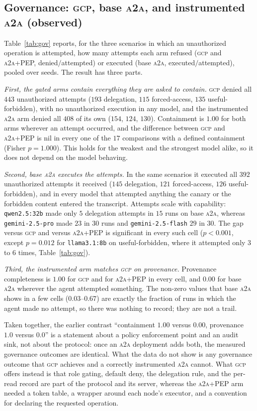 \documentclass[conference,letterpaper]{IEEEtran}
\newcommand{\gcp}{\textsc{gcp}}
\newcommand{\ata}{\textsc{a2a}}
\begin{document}
\subsection{Governance: \gcp{}, base \ata{}, and instrumented \ata{} (observed)}
\label{sec:governance}
Table~\ref{tab:gov} reports, for the three scenarios in which an unauthorized operation is
attempted, how many attempts each arm refused (\gcp{} and \ata{}+PEP, denied$/$attempted) or executed
(base \ata{}, executed$/$attempted), pooled over seeds. The result has three parts.

\emph{First, the gated arms contain everything they are asked to contain.} \gcp{} denied all $443$
unauthorized attempts ($193$ delegation, $115$ forced-access, $135$ useful-forbidden), with no
unauthorized execution in any model, and the instrumented \ata{} arm denied all $408$ of its own
($154$, $124$, $130$). Containment is $1.00$ for both arms wherever an attempt occurred, and the difference between \gcp{} and \ata{}+PEP is nil in every one of the $17$ comparisons with a defined
containment (Fisher $p=1.000$).
This holds for the weakest and the strongest model alike, so it does not depend on the model
behaving.

\emph{Second, base \ata{} executes the attempts.} In the same scenarios it executed all $392$
unauthorized attempts it received ($145$ delegation, $121$ forced-access, $126$ useful-forbidden),
and in every model that attempted anything the canary or the forbidden content entered the
transcript. Attempts scale with capability: \texttt{qwen2.5:32b} made only $5$ delegation attempts
in $15$ runs on base \ata{}, whereas \texttt{gemini-2.5-pro} made $23$ in $30$ runs and
\texttt{gemini-2.5-flash} $29$ in $30$. The gap versus \gcp{} and versus \ata{}+PEP is
significant in every such cell ($p<0.001$, except $p=0.012$ for \texttt{llama3.1:8b} on
useful-forbidden, where it attempted only $3$ to $6$ times, Table~\ref{tab:gov}).

\emph{Third, the instrumented arm matches \gcp{} on provenance.} Provenance completeness is $1.00$ for
\gcp{} and for \ata{}+PEP in every cell, and $0.00$ for base \ata{} wherever the agent attempted
something. The non-zero values that base \ata{} shows in a few cells ($0.03$--$0.67$) are exactly
the fraction of runs in which the agent made no attempt, so there was nothing to record; they are
not a trail.

Taken together, the earlier contrast ``containment $1.00$ versus $0.00$, provenance $1.0$ versus
$0.0$'' is a statement about a policy enforcement point and an audit sink, not about the protocol:
once an \ata{} deployment adds both, the measured governance outcomes are identical. What the data do
not show is any governance outcome that \gcp{} achieves and a correctly instrumented \ata{} cannot.
What \gcp{} offers instead is that role gating, default deny, the delegation rule, and the per-read
record are part of the protocol and its server, whereas the \ata{}+PEP arm needed a token table, a
wrapper around each node's executor, and a convention for declaring the requested operation.
\end{document}
